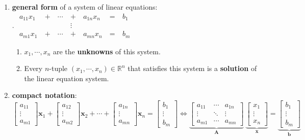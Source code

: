 \begin{enumerate}
    \item \textbf{general form} of a system of linear equations:
    \\
    .\hfill
    $
        \begin{aligned}
            a_{11}x_1\  & +\ & \cdots\ & +\ & a_{1n}x_n\ & =\ & b_1 \\
            & & & \vdots \\
            a_{m1}x_1\  & +\ & \cdots\ & +\ & a_{mn}x_n\ & =\ & b_m
        \end{aligned}
    $
    \hfill \cite{mfml/book/mml/Deisenroth-Faisal-Ong}
    \vspace{0.2cm}
    \begin{enumerate}
        \item $x_1, \cdots , x_n$ are the \textbf{unknowns} of this system.

        \item Every $n$-tuple $(x_1, \cdots , x_n) \in \mathbb{R}^n$ that satisfies this system is a \textbf{solution} of the linear equation system.
    \end{enumerate}


    \item \textbf{compact notation}:
    \\[0.2cm]
    $
        \begin{bmatrix}a_{11}\\ \vdots\\ a_{m1}\end{bmatrix} \bm{x}_1 +
        \begin{bmatrix}a_{12}\\ \vdots\\ a_{m2}\end{bmatrix} \bm{x}_2 +
        \cdots +
        \begin{bmatrix}a_{1n}\\ \vdots\\ a_{mn}\end{bmatrix} \bm{x}_n =
        \begin{bmatrix}b_{1}\\ \vdots\\ b_{m}\end{bmatrix}
    \Longleftrightarrow
        \underset{\displaystyle\bm{A}}{\underbrace{\begin{bmatrix}
            a_{11} & \cdots & a_{1n} \\
            \vdots & \ddots & \vdots \\
            a_{m1} & \cdots & a_{mn}
        \end{bmatrix}}} \
        \underset{\displaystyle\bm{x}}{\underbrace{\begin{bmatrix} x_{1} \\ \vdots \\ x_{n} \end{bmatrix}}}
        =
        \underset{\displaystyle\bm{b}}{\underbrace{\begin{bmatrix} b_{1} \\ \vdots \\ b_{m} \end{bmatrix}}}
    $
    \hfill \cite{mfml/book/mml/Deisenroth-Faisal-Ong}


\end{enumerate}

